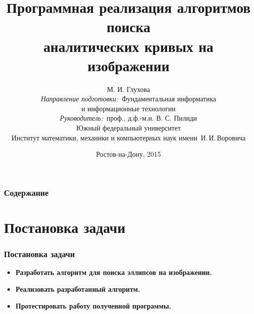 \documentclass[14pt]{beamer}
\title{\small{Программная реализация алгоритмов поиска \\аналитических кривых на изображении}}
\author{\small{%
М. И. Глухова\\%
\emph{Направление подготовки:}~Фундаментальная информатика \\и информационные технологии\\%
\emph{Руководитель:}~проф., д.ф.-м.н. В. С. Пилиди}\\%
\vspace{15pt}%
    Южный федеральный университет\\
	Институт математики, механики и компьютерных наук
    имени~И.\,И.\,Воровича%
}
\date{\small{Ростов-на-Дону, 2015}}
\begin{document}
\maketitle

\begin{frame}
\frametitle{Содержание} %
\tableofcontents %
\end{frame}

\section{Постановка задачи}

\begin{frame}
\frametitle{Постановка задачи}
\begin{block}{}
\begin{itemize}
  \item \textbf{Разработать алгоритм для поиска эллипсов на изображении.} 
  \item \textbf{Реализовать разработанный алгоритм.} 
  \item \textbf{Протестировать работу полученной программы.} 
\end{itemize}
\end{block}
\end{frame}

\end{document}
